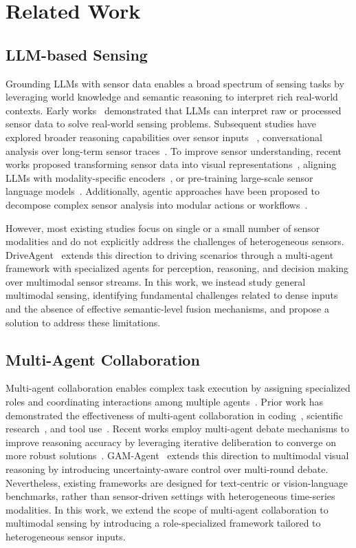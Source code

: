 \section{Related Work}
\label{sec:related_work}

\subsection{LLM-based Sensing}

Grounding LLMs with sensor data enables a broad spectrum of sensing tasks by leveraging world knowledge and semantic reasoning to interpret rich real-world contexts. Early works~\citep{penetrativeai, fewshothealth} demonstrated that LLMs can interpret raw or processed sensor data to solve real-world sensing problems. Subsequent studies have explored broader reasoning capabilities over sensor inputs~\citep{llmsense} , conversational analysis over long-term sensor traces~\citep{sensorchat}. To improve sensor understanding, recent works proposed transforming sensor data into visual representations~\citep{bymyeyes}, aligning LLMs with modality-specific encoders~\citep{llasa}, or pre-training large-scale sensor language models~\citep{sensorlm, opentslm, medtsllm}. Additionally, agentic approaches have been proposed to decompose complex sensor analysis into modular actions or workflows~\citep{autoiot, personalhealthagent}.

However, most existing studies focus on single or a small number of sensor modalities and do not explicitly address the challenges of heterogeneous sensors. DriveAgent~\citep{driveagent} extends this direction to driving scenarios through a multi-agent framework with specialized agents for perception, reasoning, and decision making over multimodal sensor streams. In this work, we instead study general multimodal sensing, identifying fundamental challenges related to dense inputs and the absence of effective semantic-level fusion mechanisms, and propose a solution to address these limitations.

\subsection{Multi-Agent Collaboration}

Multi-agent collaboration enables complex task execution by assigning specialized roles and coordinating  interactions among multiple agents~\citep{camel, metagpt}. Prior work has demonstrated the effectiveness of multi-agent collaboration in coding~\citep{chatdev}, scientific research~\citep{aiscientist}, and tool use~\citep{autogen}. Recent works employ multi-agent debate mechanisms to improve reasoning accuracy by leveraging iterative deliberation to converge on more robust solutions~\citep{debate, mad, reconcile, cmd}. GAM-Agent~\citep{gamagent} extends this direction to multimodal visual reasoning by introducing uncertainty-aware control over multi-round debate. Nevertheless, existing frameworks are designed for text-centric or vision-language benchmarks, rather than sensor-driven settings with heterogeneous time-series modalities. In this work, we extend the scope of multi-agent collaboration to multimodal sensing by introducing a role-specialized framework tailored to heterogeneous sensor inputs.
